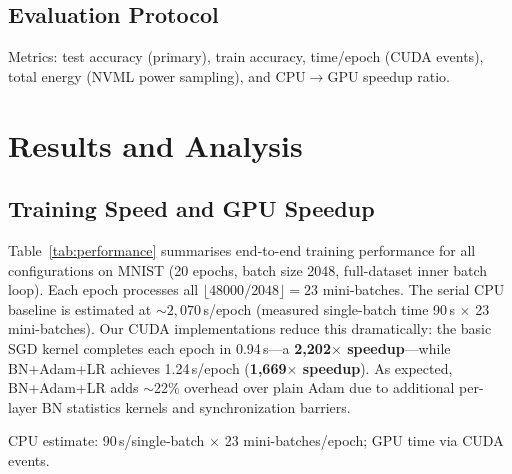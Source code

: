 \documentclass[runningheads]{llncs}
\begin{document}
\subsection{Evaluation Protocol}

Metrics: test accuracy (primary), train accuracy, time/epoch (CUDA
events), total energy (NVML power sampling), and CPU$\to$GPU speedup ratio.

\section{Results and Analysis}

\subsection{Training Speed and GPU Speedup}

Table~\ref{tab:performance} summarises end-to-end training performance for
all configurations on MNIST (20 epochs, batch size 2048, full-dataset
inner batch loop). Each epoch processes all $\lfloor 48000/2048 \rfloor =
23$ mini-batches. The serial CPU baseline is estimated at
$\sim\!2{,}070$\,s/epoch (measured single-batch time 90\,s $\times$ 23
mini-batches). Our CUDA implementations reduce this dramatically: the basic
SGD kernel completes each epoch in 0.94\,s—a \textbf{2{,}202$\times$
speedup}—while BN+Adam+LR achieves 1.24\,s/epoch
(\textbf{1{,}669$\times$ speedup}). As expected, BN+Adam+LR adds
$\sim$22\% overhead over plain Adam due to additional per-layer BN
statistics kernels and synchronization barriers.

\begin{table}[htb]
\caption{Training Performance — MNIST, 20 Epochs, Batch 2048}
\label{tab:performance}
\centering
{}
\smallskip

{\footnotesize CPU estimate: 90\,s/single-batch $\times$ 23
mini-batches/epoch; GPU time via CUDA events.}
\end{table}
\end{document}
